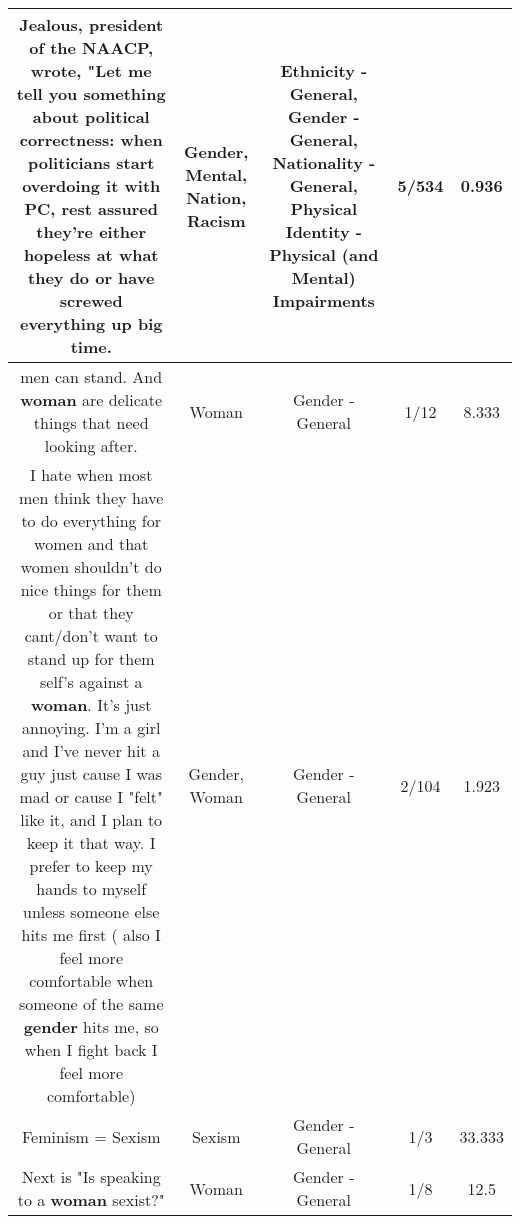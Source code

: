 \documentclass[11pt]{article}
\newlength\mylength
\begin{document}
\begin{center}
\begin{longtable}{|C{.65\mylength}|C{.30\mylength}|C{.12\mylength}|C{.12\mylength}|C{.12\mylength}|}
Jealous, president of the NAACP, wrote, "Let me tell you something about political correctness: when politicians start overdoing it with PC, rest assured they're either hopeless at what they do or have screwed everything up big time.\normalsize   & Gender, Mental, Nation, Racism & Ethnicity - General, Gender - General, Nationality - General, Physical Identity - Physical (and Mental) Impairments & 5/534 & 0.936 \\  \hline
  \small men can stand. And \textbf{woman} are delicate things that need looking after.\normalsize   & Woman & Gender - General & 1/12 & 8.333 \\  \hline
  \small I hate when most men think they have to do everything for women and that women shouldn't do nice things for them or that they cant/don't want to stand up for them self's against a \textbf{woman}. It's just annoying. I'm a girl and I've never hit a guy just cause I was mad or cause I "felt" like it, and I plan to keep it that way. I prefer to keep my hands to myself unless someone else hits me first ( also I feel more comfortable when someone of the same \textbf{gender} hits me, so when I fight back I feel more comfortable)\normalsize   & Gender, Woman & Gender - General & 2/104 & 1.923 \\  \hline
  \small Feminism = Sexism\normalsize   & Sexism & Gender - General & 1/3 & 33.333 \\  \hline
  \small Next is "Is speaking to a \textbf{woman} sexist?"\normalsize   & Woman & Gender - General & 1/8 & 12.5 \\  \hline

\end{longtable}
\end{center}
\end{document}
